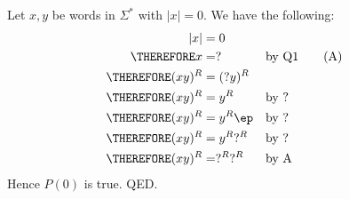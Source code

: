 Let $x, y$ be words in $\Sigma^*$ with $|x| = 0$.
We have the following:
\begin{align*}
              |x| &= 0                                \\
\THEREFORE      x &= ?               & & \text{by Q1} \tag{A} \\
\THEREFORE (xy)^R &= (? y)^R         & &              \\
\THEREFORE (xy)^R &= y^R             & & \text{by ?}  \\
\THEREFORE (xy)^R &= y^R \ep   & & \text{by ?}  \\
\THEREFORE (xy)^R &= y^R ?^R   & & \text{by ?}  \\
\THEREFORE (xy)^R &= ?^R ?^R   & & \text{by A} 
\end{align*}
Hence $P(0)$ is true.
QED.
\\

